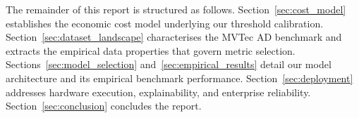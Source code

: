 The remainder of this report is structured as follows. Section~\ref{sec:cost_model} establishes the economic cost model underlying our threshold calibration. Section~\ref{sec:dataset_landscape} characterises the MVTec AD benchmark and extracts the empirical data properties that govern metric selection. Sections~\ref{sec:model_selection} and~\ref{sec:empirical_results} detail our model architecture and its empirical benchmark performance. Section~\ref{sec:deployment} addresses hardware execution, explainability, and enterprise reliability. Section~\ref{sec:conclusion} concludes the report.

